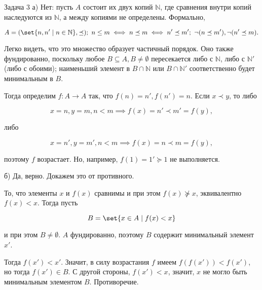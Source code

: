 \documentclass{article}
\newcommand{\N}{\mathbb{N}}
\begin{document}
	\begin{section}{Задача 3}
		а) Нет: пусть $A$ состоит их двух копий $\N$, где сравнения внутри копий наследуются из $\N$, а между копиями не определены. Формально,

		\begin{equation*}
			A = (\set{n, n' \mid n \in \N}, \preceq); \ n \le m \iff n \preceq m \iff n' \preceq m'; \ \neg (n \preceq m'), \neg (n' \preceq m).
		\end{equation*}

		Легко видеть, что это множество образует частичный порядок. Оно также фундированно, поскольку любое $B \subseteq A, B \ne \emptyset$ пересекается либо с $\N$, либо с $\N'$ (либо с обоими); наименьший элемент в $B \cap \N$ или $B \cap \N'$ соответственно будет минимальным в $B$.

		Тогда определим $f: A \to A$ так, что $f(n) = n', f(n') = n$. Если $x \prec y$, то либо

		\begin{equation*}
			x = n, y = m, n < m \implies f(x) = n' \prec m' = f(y),
		\end{equation*}

		либо

		\begin{equation*}
			x = n', y = m', n < m \implies f(x) = n \prec m = f(y),
		\end{equation*}

		поэтому $f$ возрастает. Но, например, $f(1) = 1' \succeq 1$ не выполняется.

		б) Да, верно. Докажем это от противного.

		То, что элементы $x$ и $f(x)$ сравнимы и при этом $f(x) \not\succeq x$, эквивалентно $f(x) < x$. Тогда пусть

		\begin{equation*}
			B = \set{x \in A \mid f(x) < x}
		\end{equation*}

		и при этом $B \ne \emptyset$. $A$ фундированно, поэтому $B$ содержит минимальный элемент $x'$.

		Тогда $f(x') < x'$. Значит, в силу возрастания $f$ имеем $f(f(x')) < f(x')$, но тогда $f(x') \in B$. С другой стороны, $f(x') < x$, значит, $x$ не могло быть минимальным элементом $B$. Противоречие.
	\end{section}
\end{document}
